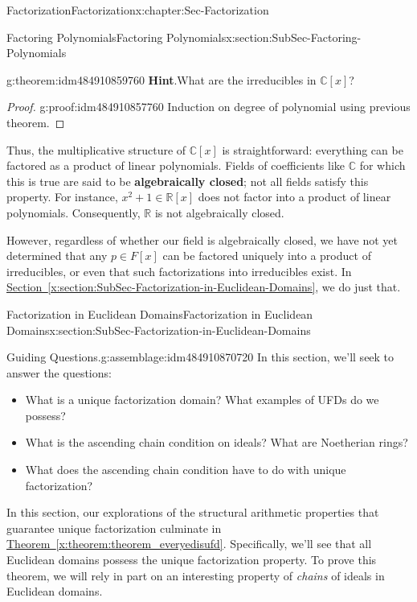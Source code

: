 \documentclass[oneside,10pt,]{book}
\newcommand{\blocktitlefont}{\relax}
\newcommand{\xreffont}{\relax}
\newcommand{\terminology}[1]{\textbf{#1}}
\numberwithin{equation}{section}
\def\C{{\mathbb C}}
\def\R{{\mathbb R}}
\begin{document}
\begin{chapterptx}{Factorization}{}{Factorization}{}{}{x:chapter:Sec-Factorization}
\begin{sectionptx}{Factoring Polynomials}{}{Factoring Polynomials}{}{}{x:section:SubSec-Factoring-Polynomials}
\begin{theorem}{}{}{g:theorem:idm484910859760}
\textbf{\blocktitlefont Hint}.\quad{}What are the irreducibles in \(\C[x]\)?%
\end{theorem}
\begin{proof}{}{g:proof:idm484910857760}
Induction on degree of polynomial using previous theorem.%
\end{proof}
Thus, the multiplicative structure of \(\C[x]\) is straightforward: everything can be factored as a product of linear polynomials. Fields of coefficients like \(\C\) for which this is true are said to be \terminology{algebraically closed}; not all fields satisfy this property. For instance, \(x^2 + 1\in \R[x]\) does not factor into a product of linear polynomials. Consequently, \(\R\) is not algebraically closed.%
\par
However, regardless of whether our field is algebraically closed, we have not yet determined that any \(p\in F[x]\) can be factored uniquely into a product of irreducibles, or even that such factorizations into irreducibles exist. In \hyperref[x:section:SubSec-Factorization-in-Euclidean-Domains]{Section~{\xreffont\ref{x:section:SubSec-Factorization-in-Euclidean-Domains}}}, we do just that.%
\end{sectionptx}
%
%
\typeout{************************************************}
\typeout{************************************************}
%
\begin{sectionptx}{Factorization in Euclidean Domains}{}{Factorization in Euclidean Domains}{}{}{x:section:SubSec-Factorization-in-Euclidean-Domains}
\begin{assemblage}{Guiding Questions.}{g:assemblage:idm484910870720}%
In this section, we'll seek to answer the questions: %
\begin{itemize}[label=\textbullet]
\item{}What is a unique factorization domain? What examples of UFDs do we possess?%
\item{}What is the ascending chain condition on ideals? What are Noetherian rings?%
\item{}What does the ascending chain condition have to do with unique factorization?%
\end{itemize}
%
\end{assemblage}
\begin{introduction}{}%
In this section, our explorations of the structural arithmetic properties that guarantee unique factorization culminate in \hyperref[x:theorem:theorem_everyedisufd]{Theorem~{\xreffont\ref{x:theorem:theorem_everyedisufd}}}. Specifically, we'll see that all Euclidean domains possess the unique factorization property. To prove this theorem, we will rely in part on an interesting property of \emph{chains} of ideals in Euclidean domains.%

\end{introduction}
\end{sectionptx}
\end{chapterptx}
\end{document}
